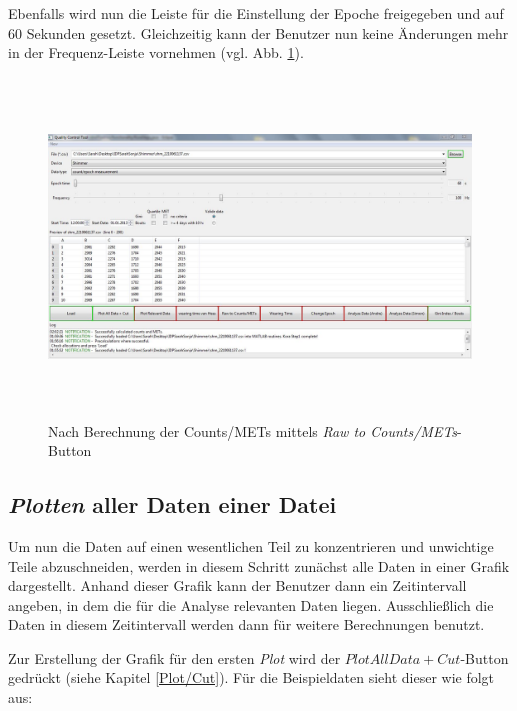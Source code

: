 \documentclass[onecolumn,german]{article}
\begin{document}
Ebenfalls wird nun die Leiste für die Einstellung der Epoche freigegeben und auf 60 Sekunden gesetzt. Gleichzeitig kann der Benutzer nun keine Änderungen mehr in der Frequenz-Leiste vornehmen (vgl. Abb. \ref{rawToCounts}).\newline

\begin{figure}[H]
\centerline{
\includegraphics[width=160mm, height=90mm]{Abbildungen/RawToCounts.JPG}
}
\caption {Nach Berechnung der Counts/METs mittels \textit{Raw to Counts/METs}-Button}
\label{rawToCounts}
\end{figure}

\subsection{\textit{Plotten} aller Daten einer Datei}\label{Plotten aller Daten}

Um nun die Daten auf einen wesentlichen Teil zu konzentrieren und unwichtige Teile abzuschneiden, werden in diesem Schritt zunächst alle Daten in einer Grafik dargestellt. Anhand dieser Grafik kann der Benutzer dann ein Zeitintervall angeben, in dem die für die Analyse relevanten Daten liegen. Ausschließlich die Daten in diesem Zeitintervall werden dann für weitere Berechnungen benutzt.\newline

Zur Erstellung der Grafik für den ersten \textit{Plot} wird der \mbox{\textit{$PlotAllData + Cut$}-Button} gedrückt (siehe Kapitel \ref{Plot/Cut}). \newline Für die Beispieldaten sieht dieser wie folgt aus:
\end{document}
